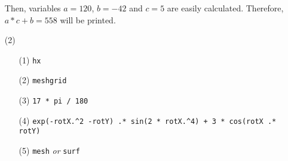 \documentclass[11pt,a4paper]{article}
\begin{document}
\begin{enumerate}
    Then, variables $a=120$, $b=-42$ and $c=5$ are easily calculated. Therefore, $a * c + b = 558$ will be printed.

    \item[(2)] ~
    \begin{enumerate}
        \item[(1)] \verb"hx"
        \item[(2)] \verb"meshgrid"
        \item[(3)] \verb"17 * pi / 180"
        \item[(4)] \verb"exp(-rotX.^2 -rotY) .* sin(2 * rotX.^4) + 3 * cos(rotX .* rotY)"
        \item[(5)] \verb"mesh" \textit{or} \verb"surf"
    \end{enumerate}
\end{enumerate}
\end{document}
